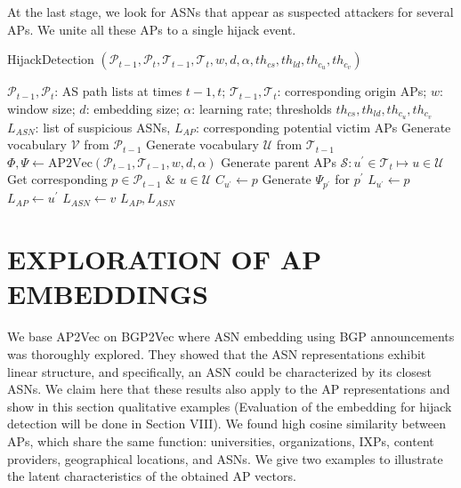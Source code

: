 \documentclass[10pt,journal]{IEEEtran}
\begin{document}
At the last stage, we look for ASNs that appear as suspected attackers for several APs. We unite all these APs to a single hijack event.
\begin{algorithm}[htbp]
\caption{HijackDetection $(\mathcal{P}_{t-1},\mathcal{P}_{t},\mathcal{T}_{t-1},\mathcal{T}_{t}, w, d,\alpha, th_{cs}, th_{ld}, th_{c_u}, th_{c_v})$}
\label{alg:hijack_detection}
\begin{algorithmic}[1]
\Require $\mathcal{P}_{t-1},\mathcal{P}_{t}$: AS path lists at times $t-1,t$; $\mathcal{T}_{t-1},\mathcal{T}_{t}$: corresponding origin APs; $w$: window size; $d$: embedding size; $\alpha$: learning rate; thresholds $th_{cs}, th_{ld}, th_{c_u}, th_{c_v}$
\Ensure $L_{ASN}$: list of suspicious ASNs, $L_{AP}$: corresponding potential victim APs
\State Generate vocabulary $\mathcal{V}$ from $\mathcal{P}_{t-1}$
\State Generate vocabulary $\mathcal{U}$ from $\mathcal{T}_{t-1}$
\State $\Phi,\Psi \leftarrow \text{AP2Vec}(\mathcal{P}_{t-1},\mathcal{T}_{t-1}, w, d,\alpha)$
\State Generate parent APs $\mathcal{S}: u^{\prime} \in \mathcal{T}_{t} \mapsto u \in \mathcal{U}$
\State Get corresponding $p \in \mathcal{P}_{t-1}$ \& $u \in \mathcal{U}$
\State $C_{u^{\prime}} \leftarrow p$
\State Generate $\Psi_{p^{\prime}}$ for $p^{\prime}$
\State $L_{u^{\prime}} \leftarrow p$
\EndIf
\EndIf
\EndFor
{}
\State $L_{AP} \leftarrow u^{\prime}$
\State $L_{ASN} \leftarrow v$
\EndIf
\EndFor
\EndIf
\EndFor
\State \Return $L_{AP}, L_{ASN}$
\end{algorithmic}
\end{algorithm}

\section{EXPLORATION OF AP EMBEDDINGS}
We base AP2Vec on BGP2Vec \cite{shapira2020deep, shapira2020unveiling} where ASN embedding using BGP announcements was thoroughly explored. They showed that the ASN representations exhibit linear structure, and specifically, an ASN could be characterized by its closest ASNs. We claim here that these results also apply to the AP representations and show in this section qualitative examples (Evaluation of the embedding for hijack detection will be done in Section VIII). We found high cosine similarity between APs, which share the same function: universities, organizations, IXPs, content providers, geographical locations, and ASNs. We give two examples to illustrate the latent characteristics of the obtained AP vectors.
\end{document}
